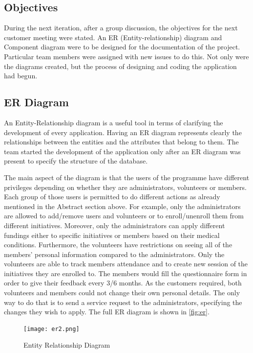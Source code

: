 \documentclass{l3proj}
\begin{document}
\subsection{Objectives}
\label{sec:design-objectives}

During the next iteration, after a group discussion, the objectives for the next customer meeting were stated. An ER (Entity-relationship) diagram and Component diagram were to be designed for the documentation of the project. Particular team members were assigned with new issues to do this. Not only were the diagrams created, but the process of designing and coding the application had begun.

\subsection{ER Diagram}
\label{sec:er}

An Entity-Relationship diagram \cite{er} is a useful tool in terms of clarifying the development of every application. Having an ER diagram represents clearly the relationships between the entities and the attributes that belong to them. The team started the development of the application only after an ER diagram was present to specify the structure of the database.

The main aspect of the diagram is that the users of the programme have different privileges depending on whether they are administrators, volunteers or members. Each group of those users is permitted to do different actions as already mentioned in the Abstract section above. For example, only the administrators are allowed to add/remove users and volunteers or to enroll/unenroll them from different initiatives. Moreover, only the administrators can apply different fundings either to specific initiatives or members based on their medical conditions. Furthermore, the volunteers have restrictions on seeing all of the members' personal information compared to the administrators. Only the volunteers are able to track members attendance and to create new session of  the initiatives they are enrolled to. The members would fill the questionnaire form in order to give their feedback every 3/6 months. As the customers required, both volunteers and members could not change their own personal details. The only way to do that is to send a service request to the administrators, specifying the changes they wish to apply. The full ER diagram is shown in \autoref{fig:er}.

\begin{figure}
\centerline{\texttt{[image: er2.png]}}
\caption{Entity Relationship Diagram}
\label{fig:er}
\end{figure}
\end{document}
